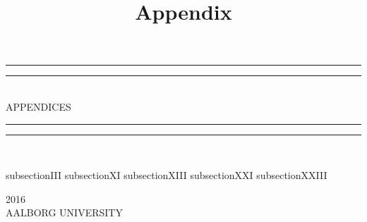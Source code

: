 \documentclass{article}
\begin{document}
\title{Appendix}

\newlength{\drop}

		\textheight
		\centering
		\vspace*{\baselineskip}
		\rule{\textwidth}{1.6pt}\vspace*{-\baselineskip}\vspace*{2pt}
		\rule{\textwidth}{0.4pt}\\[\baselineskip]
		{\LARGE APPENDICES}\\[0.2\baselineskip]
		\rule{\textwidth}{0.4pt}\vspace*{-\baselineskip}\vspace{3.2pt}
		\rule{\textwidth}{1.6pt}\\[\baselineskip]
		\scshape
		\vspace*{2\baselineskip}
\tableofcontents




 {subsection}{\pictures}{III}
 {subsection}{\demographics}{XI}
 {subsection}{\rawtestlog}{XIII}
 {subsection}{\rawcommentslog}{XXI}
 {subsection}{\oldpaper}{XXIII}

\vspace*{2\baselineskip}
\vspace*{2\baselineskip}
{\scshape 2016} \\
{\large AALBORG UNIVERSITY}\par
\end{document}
